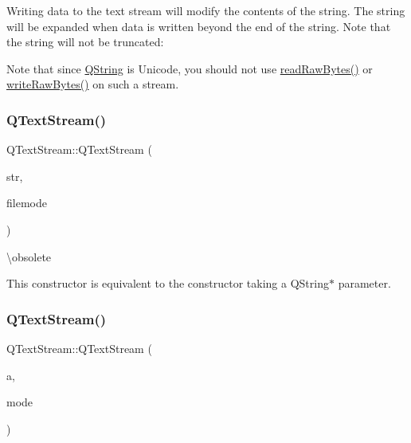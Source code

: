 Writing data to the text stream will modify the contents of the string. The string will be expanded when data is written beyond the end of the string. Note that the string will not be truncated\+: 
\begin{DoxyCode}{0}
\end{DoxyCode}


Note that since \mbox{\hyperlink{class_q_string}{Q\+String}} is Unicode, you should not use \mbox{\hyperlink{class_q_text_stream_a5320c9f2058d72a264aa2152cc69852e}{read\+Raw\+Bytes()}} or \mbox{\hyperlink{class_q_text_stream_ac92bd94165a60152f12905deed163189}{write\+Raw\+Bytes()}} on such a stream. \mbox{\label{class_q_text_stream_a917a19a834861178ce1a7c57ee37ec41}} 
\subsubsection{\texorpdfstring{QTextStream()}{QTextStream()}\hspace{0.1cm}{\footnotesize\ttfamily [4/6]}}
{\footnotesize\ttfamily Q\+Text\+Stream\+::\+Q\+Text\+Stream (\begin{DoxyParamCaption}\item[{\mbox{\hyperlink{class_q_string}{Q\+String}} \&}]{str,  }\item[{int}]{filemode }\end{DoxyParamCaption})}

\textbackslash{}obsolete

This constructor is equivalent to the constructor taking a Q\+String$\ast$ parameter. \mbox{\label{class_q_text_stream_a00d490a0530b4bcd9554b9316815d35a}} 
\subsubsection{\texorpdfstring{QTextStream()}{QTextStream()}\hspace{0.1cm}{\footnotesize\ttfamily [5/6]}}
{\footnotesize\ttfamily Q\+Text\+Stream\+::\+Q\+Text\+Stream (\begin{DoxyParamCaption}\item[{\mbox{\hyperlink{class_q_array}{Q\+Byte\+Array}}}]{a,  }\item[{int}]{mode }\end{DoxyParamCaption})}

